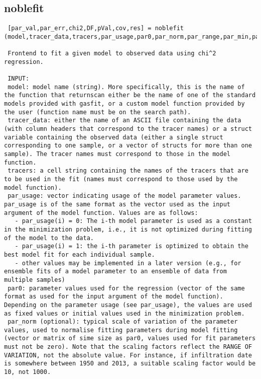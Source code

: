 \subsection{noblefit}\label{sec:ref-noblefit}
\begin{lstlisting}
 [par_val,par_err,chi2,DF,pVal,cov,res] = noblefit (model,tracer_data,tracers,par_usage,par0,par_norm,par_range,par_min,par_max);

 Frontend to fit a given model to observed data using chi^2 regression.

 INPUT:
 model: model name (string). More specifically, this is the name of the function that returnscan either be the name of one of the standard models provided with gasfit, or a custom model function provided by the user (function name must be on the search path).
 tracer_data: either the name of an ASCII file containing the data (with column headers that correspond to the tracer names) or a struct variable containing the observed data (either a single struct corresponding to one sample, or a vector of structs for more than one sample). The tracer names must correspond to those in the model function.
 tracers: a cell string containing the names of the tracers that are to be used in the fit (names must correspond to those used by the model function).
 par_usage: vector indicating usage of the model parameter values. par_usage is of the same format as the vector used as the input argument of the model function. Values are as follows:
   - par_usage(i) = 0: The i-th model parameter is used as a constant in the minimization problem, i.e., it is not optimized during fitting of the model to the data.
   - par_usage(i) = 1: the i-th parameter is optimized to obtain the best model fit for each individual sample.
   - other values may be implemented in a later version (e.g., for ensemble fits of a model parameter to an ensemble of data from multiple samples)
 par0: parameter values used for the regression (vector of the same format as used for the input argument of the model function). Depending on the parameter usage (see par_usage), the values are used as fixed values or initial values used in the minimization problem.
 par_norm (optional): typical scale of variation of the parameter values, used to normalise fitting parameters during model fitting (vector or matrix of sime size as par0, values used for fit parameters must not be zero). Note that the scaling factors reflect the RANGE OF VARIATION, not the absolute value. For instance, if infiltration date is somewhere between 1950 and 2013, a suitable scaling factor would be 10, not 1000.

\end{lstlisting}
